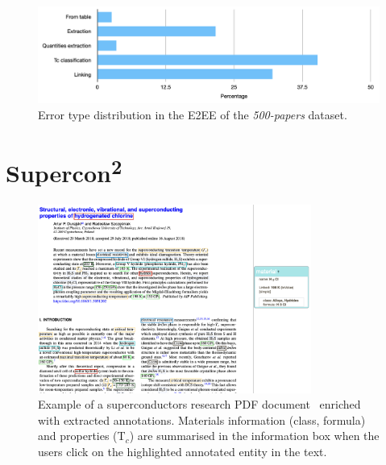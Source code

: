 \documentclass[]{interact}
\theoremstyle{plain}%
\theoremstyle{definition}
\theoremstyle{remark}
\newcommand{\tc}{T$_{c}$}
\begin{document}
\begin{figure}[ht]
    \centering
    \includegraphics[width=\linewidth]{error-types-bars-perc}
    \caption{Error type distribution in the E2EE of the \textit{500-papers} dataset.}
    \label{fig:error-types-distribution}
\end{figure}



\section{Supercon\textsuperscript{2}}

\begin{figure}[ht!]
    \centering
    \includegraphics[width=0.8\textwidth]{sample-pdf-annotations}
    \caption{\label{fig:pdf-annotations} Example of a superconductors research PDF document~\cite{sample_superconductors_article} enriched with extracted annotations. Materials information (class, formula) and properties (\tc) are summarised in the information box when the users click on the highlighted annotated entity in the text.}
\end{figure}
\end{document}
